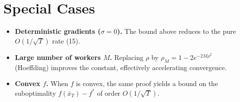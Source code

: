 \documentclass{article}
\begin{document}
\section*{Special Cases}
\begin{itemize}
\item \textbf{Deterministic gradients ($\sigma=0$).}  The bound above
reduces to the pure $O(1/\sqrt{T})$ rate (15).
\item \textbf{Large number of workers $M$.}  Replacing $\rho$ by
$\rho_M=1-2e^{-2M\rho^{2}}$ (Hoeffding) improves the constant, effectively
accelerating convergence.
\item \textbf{Convex $f$.}  When $f$ is convex, the same proof yields a bound
on the suboptimality $f(\bar x_T)-f^{*}$ of order $O(1/\sqrt{T})$.
\end{itemize}
\end{document}
